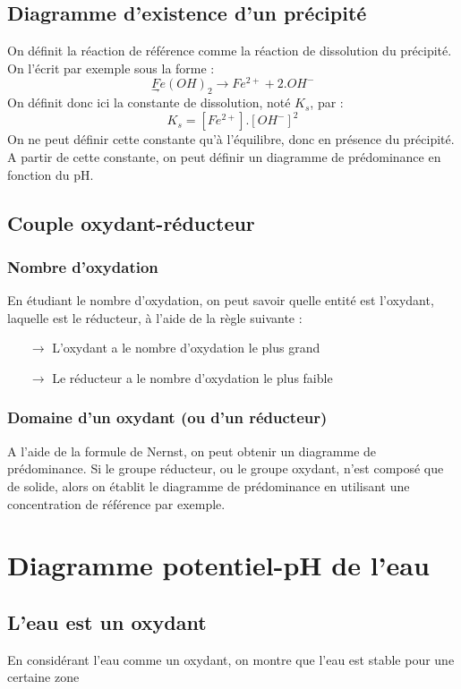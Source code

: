 \subsection{Diagramme d'existence d'un précipité}
On définit la réaction de référence comme la réaction de dissolution du précipité. On l'écrit par exemple sous la forme : 
$$\underset{\rightharpoondown}Fe(OH)_2 \rightarrow Fe^{2+} + 2.OH^{-}$$
On définit donc ici la constante de dissolution, noté $K_s$, par : 
$$K_s = [Fe^{2+}].[OH^-]^2$$
On ne peut définir cette constante qu'à l'équilibre, donc en présence du précipité. A partir de cette constante, on peut définir un diagramme de prédominance en fonction du pH.
\subsection{Couple oxydant-réducteur}
\subsubsection{Nombre d'oxydation}
En étudiant le nombre d'oxydation, on peut savoir quelle entité est l'oxydant, laquelle est le réducteur, à l'aide de la règle suivante : 
\begin{itemize}
 \item[$\rightarrow$] L'oxydant a le nombre d'oxydation le plus grand
 \item[$\rightarrow$] Le réducteur a le nombre d'oxydation le plus faible
\end{itemize}
\subsubsection{Domaine d'un oxydant (ou d'un réducteur)}
A l'aide de la formule de Nernst, on peut obtenir un diagramme de prédominance. Si le groupe réducteur, ou le groupe oxydant, n'est composé que de solide, alors on établit le diagramme de prédominance en utilisant une concentration de référence par exemple.
\section{Diagramme potentiel-pH de l'eau}
\subsection{L'eau est un oxydant}
En considérant l'eau comme un oxydant, on montre que l'eau est stable pour une certaine zone 
